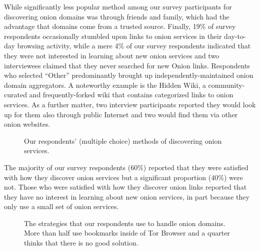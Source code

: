 While significantly less popular method among our survey participants for discovering onion domains was through friends and
family, which had the advantage that domains come from a trusted source. 
Finally, 19\% of survey respondents occasionally
stumbled upon links to onion services in their day-to-day browsing activity, while
a mere
4\% of our survey respondents indicated that they were not interested in learning about new onion services and two interviewees claimed that they never searched for new Onion links.
Respondents who selected ``Other'' predominantly brought up
independently-maintained onion domain aggregators.  A noteworthy example is the
Hidden Wiki, a community-curated and frequently-forked wiki that contains
categorized links to onion services.  As a further matter, two interview participants reported they would look up for them also through public Internet and two would find them via other onion websites.

\begin{figure}[t]
    \centering
    
    \caption{Our respondents' (multiple choice) methods of discovering onion
    services.}
    \label{fig:onion-discovery}
\end{figure}

The majority of our survey respondents (60\%) reported that they were satisfied with how they discover onion services but a significant proportion (40\%) were not. Those who were satisfied with how they discover onion links reported that they have no
interest in learning about new onion services, in part because they only use a
small set of onion services.  



\begin{figure}[t]
    \centering
    
    \caption{The strategies that our respondents use to handle onion domains.
    More than half use bookmarks inside of Tor Browser and a quarter thinks that
    there is no good solution.}
    \label{fig:onion-domain-mgmt}
\end{figure}


